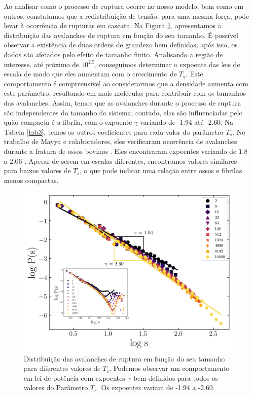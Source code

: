\documentclass[11pt,a4paper]{article} %
\begin{document}
 

        Ao analisar como o processo de ruptura ocorre no nosso modelo, bem como em outros, constatamos que a  
        redistribuição de tensão, para uma mesma força, pode levar à ocorrência de rupturas em cascata. Na Figura  
        \ref{R7}, apresentamos a distribuição das avalanches de ruptura em função do seu tamanho. É possível observar a  
        existência de duas ordens de grandeza bem definidas; após isso, os dados são afetados pelo efeito de tamanho  
        finito. Analisando a região de interesse, até próximo de \(10^{2.5}\), conseguimos determinar o expoente das leis  
        de escala de modo que eles aumentam com o crescimento de \(T_{s}\). Este comportamento é compreensível ao  
        considerarmos que a densidade aumenta com este parâmetro, resultando em mais moléculas para contribuir com os  
        tamanhos das avalanches. Assim, temos que as avalanches durante o processo de ruptura são independentes do tamanho  
        do sistema; contudo, elas são influenciadas pelo quão compacta é a fibrila, com o expoente \(\gamma\) variando de  
        -1.94 até -2.60. Na Tabela \ref{tab3}, temos os outros coeficientes para cada valor do parâmetro \(T_{s}\). 
        No trabalho de Mayya e colaboradores, eles verificaram ocorrência de avalanches durante a fratura de ossos bovinos 
        \cite{Mayya2016SplittingFI}. Eles encontraram expoentes variando de \(1.8\) a \(2.06\) \cite{Mayya2016SplittingFI}. 
        Apesar de serem em escalas diferentes, encontramos valores similares para baixos valores de \(T_{s}\), o que pode  
        indicar uma relação entre ossos e fibrilas menos compactas.  


        \begin{figure}[H] 

            \centering 
            \includegraphics[width=\textwidth]{figures/ava.png} 
            \caption{Distribuição das avalanches de ruptura em função do seu tamanho para diferentes valores de \(T_{s}\). 
            Podemos observar um comportamento em lei de potência com expoentes $\gamma$ bem definidos para todos os valores do  
            Parâmetro \(T_{s}\). Os expoentes variam de -1.94 a -2.60.}  
            \label{R7} 

        \end{figure} 
\end{document}
